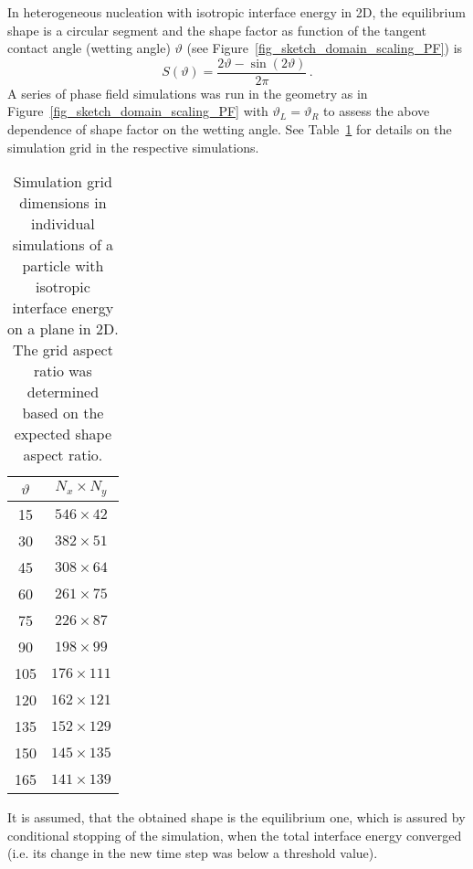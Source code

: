 	In heterogeneous nucleation with isotropic interface energy in 2D, the equilibrium shape is a circular segment and the shape factor as function of the tangent contact angle (wetting angle) $\vartheta$ (see Figure~\ref{fig_sketch_domain_scaling_PF}) is
	\begin{equation}
		S(\vartheta) = \frac{2\vartheta - \sin(2\vartheta)}{2\pi} \,.
	\end{equation}
	A series of phase field simulations was run in the geometry as in Figure~\ref{fig_sketch_domain_scaling_PF} with $\vartheta_L=\vartheta_R$ to assess the above dependence of shape factor on the wetting angle. See Table~\ref{tab_PF_NPA_param_particle_onplane} for details on the simulation grid in the respective simulations.
	\begin{table}
		\centering
		\caption[PF wetting simulation of a particle with isotropic interface energy - simulation grid dimensions]{Simulation grid dimensions in individual simulations of a particle with isotropic interface energy on a plane in 2D. The grid aspect ratio was determined based on the expected shape aspect ratio.}
		\label{tab_PF_NPA_param_particle_onplane}
		\begin{tabular}{c|c}
			$\vartheta$ & $N_x\times N_y$ \\ \hline
			15	&	$546\times 42$	\\
			30	&	$382\times 51$	\\
			45	&	$308\times 64$	\\
			60	&	$261\times 75$	\\
			75	&	$226\times 87$	\\
			90	&	$198\times 99$	\\
			105	&	$176\times 111$	\\
			120	&	$162\times 121$	\\
			135	&	$152\times 129$	\\
			150	&	$145\times 135$	\\
			165	&	$141\times 139$	
		\end{tabular}
	\end{table}
	It is assumed, that the obtained shape is the equilibrium one, which is assured by conditional stopping of the simulation, when the total interface energy converged (i.e. its change in the new time step was below a threshold value). 
	
